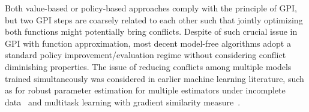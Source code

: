 Both value-based or policy-based approaches comply with the principle of GPI,
but two GPI steps are coarsely related to each other such that jointly optimizing both functions might potentially bring conflicts. 
Despite of such crucial issue in GPI with function approximation, most decent model-free algorithms adopt a standard policy improvement/evaluation regime without considering conflict diminishing properties. 
The issue of reducing conflicts among multiple models trained simultaneously was considered in earlier machine learning literature,
such as for robust parameter estimation for multiple estimators under incomplete data~\citep{robins1995semiparametric,lunceford2004stratification,kang2007demystifying} and multitask learning with  gradient similarity measure~\citep{ChenNHLKCA20,YuK0LHF20,JavaloyV22}. 


